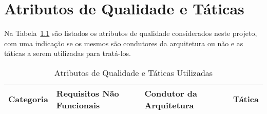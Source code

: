 \chapter{Atributos de Qualidade e Táticas}
\label{sec-atributos}

Na Tabela~\ref{tabela-atributos} são listados os atributos de qualidade considerados neste projeto, com uma indicação se os mesmos são condutores da arquitetura ou não e as táticas a serem utilizadas para tratá-los.

\begin{table}[h]
	\centering	
	\vspace{0.5cm}
	\caption{Atributos de Qualidade e Táticas Utilizadas}	
	\label{tabela-atributos}
	\begin{tabular}{|p{3.5cm}|p{2cm}|p{1.9cm}|p{7cm}|}  \hline 
	
 		\rowcolor[rgb]{0.8,0.8,0.8} Categoria & Requisitos Não Funcionais & Condutor da Arquitetura & Tática \\\hline 
 		
	\end{tabular}
\end{table}
